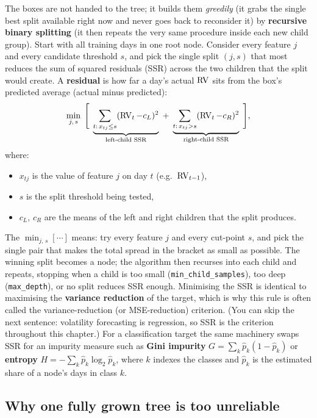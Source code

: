 The boxes are not handed to the tree; it builds them \emph{greedily} (it
grabs the single best split available right now and never goes back to
reconsider it) by \textbf{recursive binary splitting} (it then repeats the
very same procedure inside each new child group).  Start with all training
days in one root node.  Consider every feature $j$ and every candidate
threshold $s$, and pick the single split $(j, s)$ that most reduces the sum
of squared residuals (SSR) across the two children that the split would
create.  A \textbf{residual} is how far a day's actual $\operatorname{RV}$ sits from the
box's predicted average (actual minus predicted):
\begin{equation}\label{eq:trees:cart_split}
  \min_{j,\,s}\;
  \Bigg[\;
  \underbrace{\sum_{t:\,x_{tj}\le s}(\operatorname{RV}_t - c_L)^2}_{\text{left-child SSR}}
  \;+\;
  \underbrace{\sum_{t:\,x_{tj}> s}(\operatorname{RV}_t - c_R)^2}_{\text{right-child SSR}}
  \;\Bigg],
\end{equation}
where:
\begin{itemize}[leftmargin=1.8em]
  \item $x_{tj}$ is the value of feature $j$ on day $t$ (e.g.\ $\operatorname{RV}_{t-1}$),
  \item $s$ is the split threshold being tested,
  \item $c_L,\,c_R$ are the means of the left and right children that the
        split produces.
\end{itemize}
The $\min_{j,\,s}[\cdots]$ means: try every feature $j$ and every cut-point
$s$, and pick the single pair that makes the total spread in the bracket as
small as possible.  The winning split becomes a node; the algorithm then recurses into each
child and repeats, stopping when a child is too small
(\texttt{min\_child\_samples}), too deep (\texttt{max\_depth}), or no split
reduces SSR enough.  Minimising the SSR is identical to maximising the
\textbf{variance reduction} of the target, which is why this rule is often
called the variance-reduction (or MSE-reduction) criterion.  (You can skip
the next sentence: volatility forecasting is regression, so SSR is the
criterion throughout this chapter.)  For a classification target the same
machinery swaps SSR for an impurity measure such as \textbf{Gini impurity}
$G = \sum_k \hat{p}_k(1-\hat{p}_k)$ or \textbf{entropy}
$H = -\sum_k \hat{p}_k \log_2 \hat{p}_k$, where $k$ indexes the classes and
$\hat{p}_k$ is the estimated share of a node's days in class $k$.

\subsection{Why one fully grown tree is too unreliable}

